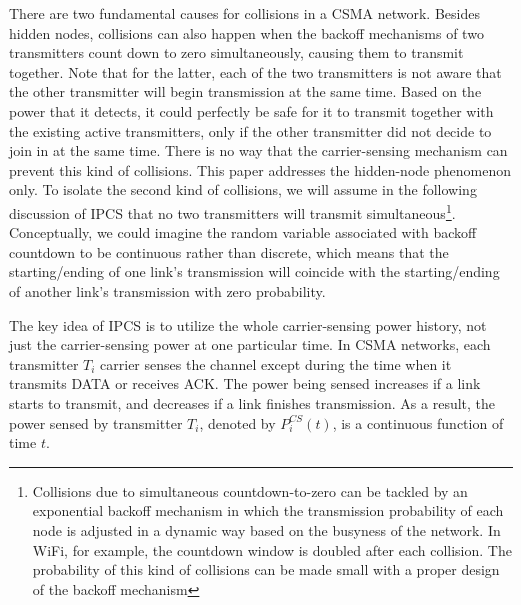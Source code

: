 \documentclass[conference]{IEEEtran}
\begin{document}
There are two fundamental causes for collisions in a CSMA network.
Besides hidden nodes, collisions can also happen when the backoff
mechanisms of two transmitters count down to zero simultaneously,
causing them to transmit together. Note that for the latter, each of
the two transmitters is not aware that the other transmitter will
begin transmission at the same time. Based on the power that it
detects, it could perfectly be safe for it to transmit together with
the existing active transmitters, only if the other transmitter did
not decide to join in at the same time. There is no way that the
carrier-sensing mechanism can prevent this kind of collisions. This
paper addresses the hidden-node phenomenon only. To isolate the
second kind of collisions, we will assume in the following
discussion of IPCS that no two transmitters will transmit
simultaneous\footnote[3]{Collisions due to simultaneous
countdown-to-zero can be tackled by an exponential backoff mechanism
in which the transmission probability of each node is adjusted in a
dynamic way based on the busyness of the network. In WiFi, for
example, the countdown window is doubled after each collision. The
probability of this kind of collisions can be made small with a
proper design of the backoff mechanism}. Conceptually, we could
imagine the random variable associated with backoff countdown to be
continuous rather than discrete, which means that the
starting/ending of one link's transmission will coincide with the
starting/ending of another link's transmission with zero
probability.






The key idea of IPCS is to utilize the whole carrier-sensing power
history, not just the carrier-sensing power at one particular time.
In CSMA networks, each transmitter $T_i$ carrier senses the channel
except during the time when it transmits DATA or receives ACK. The
power being sensed increases if a link starts to transmit, and
decreases if a link f\/inishes transmission. As a result, the power
sensed by transmitter $T_i$, denoted by $P_{i}^{CS}(t)$, is a
continuous function of time $t$.
\end{document}
